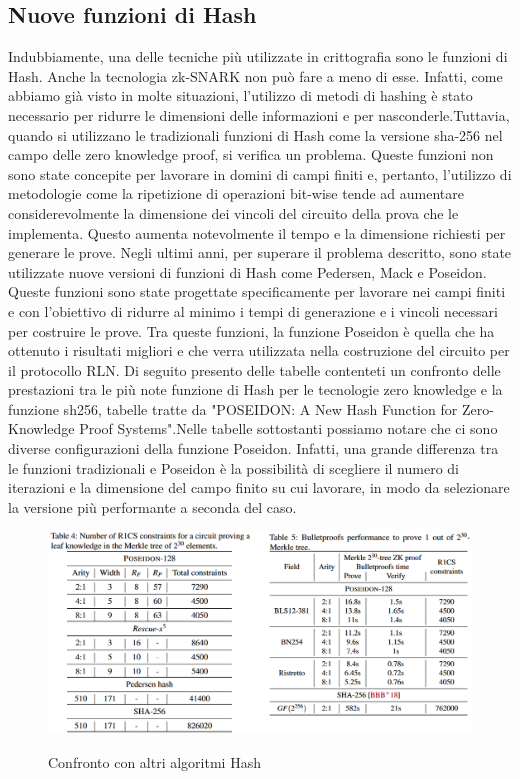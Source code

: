 \subsection{Nuove funzioni di Hash}
Indubbiamente, una delle tecniche più utilizzate in crittografia sono le funzioni di Hash. Anche la tecnologia zk-SNARK
non può fare a meno di esse. Infatti, come abbiamo già visto in molte situazioni, l'utilizzo di metodi di hashing è
stato necessario per ridurre le dimensioni delle informazioni e per nasconderle.Tuttavia, quando si utilizzano le
tradizionali funzioni di Hash come la versione sha-256 nel campo delle zero knowledge proof, si verifica un problema.
Queste funzioni non sono state concepite per lavorare in domini di campi finiti e, pertanto, l'utilizzo di metodologie
come la ripetizione di operazioni bit-wise tende ad aumentare considerevolmente la dimensione dei vincoli del circuito
della prova che le implementa. Questo aumenta notevolmente il tempo e la dimensione richiesti per generare le prove.
Negli ultimi anni, per superare il problema descritto, sono state utilizzate nuove versioni di funzioni di Hash come
Pedersen, Mack e Poseidon. Queste funzioni sono state progettate specificamente per lavorare nei campi finiti e con
l'obiettivo di ridurre al minimo i tempi di generazione e i vincoli necessari per costruire le prove. Tra queste
funzioni, la funzione Poseidon è quella che ha ottenuto i risultati migliori e che verra utilizzata nella costruzione
del circuito per il protocollo RLN. Di seguito presento delle tabelle contenteti un confronto delle prestazioni tra le
più note funzione di Hash per le tecnologie zero knowledge e la funzione sh256, tabelle tratte da "POSEIDON: A New Hash
Function for Zero-Knowledge Proof Systems"\cite{cryptoeprint:2019-458}.Nelle tabelle sottostanti possiamo notare che ci
sono diverse configurazioni della funzione Poseidon. Infatti, una grande differenza tra le funzioni tradizionali e
Poseidon è la possibilità di scegliere il numero di iterazioni e la dimensione del campo finito su cui lavorare, in modo
da selezionare la versione più performante a seconda del caso.
\begin{figure}[H]
    \centering
    \includegraphics[width=15cm]{./chapters/2.rln-protocol/images/3.poseidon_comparison.png}
    \label{fig:poseidon_comparison}
    \captionsetup{justification=centering}
    \caption{Confronto con altri algoritmi Hash}
\end{figure}

